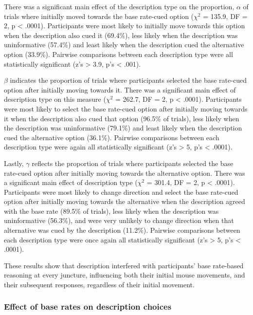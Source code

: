 There was a significant main effect of the description type
on the proportion, $\alpha$ of trials where
initially moved towards the base rate-cued option
($\chi^2$ = 135.9, DF = 2, p < .0001).
Participants were most likely to initially move towards
this option
when the description also cued it (69.4\%),
less likely when the description was uninformative (57.4\%)
and least likely when the description cued the alternative option (33.9\%).
Pairwise comparisons between each description type
were all statistically significant
(z's > 3.9, p's < .001).

$\beta$ indicates the proportion of trials
where participants selected the base rate-cued option
after initially moving towards it.
There was a significant main effect of description type on this measure
($\chi^2$ = 262.7, DF = 2, p < .0001).
Participants were most likely to select the base rate-cued option
after initially moving towards it
when the description also cued that option (96.5\% of trials),
less likely when the description was uninformative (79.1\%)
and least likely when the description cued the alternative option (36.1\%).
Pairwise comparisons between each description type
were again all statistically significant
(z's > 5, p's < .0001).


Lastly, $\gamma$ reflects the proportion
of trials where participants selected the base rate-cued option
after initially moving towards the alternative option.
There was a significant main effect of description type
($\chi^2$ = 301.4, DF = 2, p < .0001).
Participants were most likely to change direction
and select the base rate-cued option
after initially moving towards the alternative
when the description agreed with the base rate (89.5\% of trials),
less likely when the description was uninformative (56.3\%),
and were very unlikely to change direction
when that alternative was cued by the description (11.2\%).
Pairwise comparisons between each description type
were once again all statistically significant
(z's > 5, p's < .0001).

These results show that description interfered with
participants' base rate-based reasoning at every juncture,
influencing both their initial mouse movements,
and their subsequent responses,
regardless of their initial movement.


\subsubsection{Effect of base rates on description choices}




